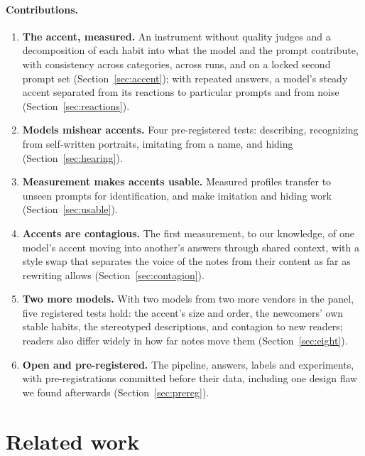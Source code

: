\documentclass[11pt]{article}
\begin{document}
\paragraph{Contributions.}
\begin{enumerate}
\item \textbf{The accent, measured.} An instrument without quality judges and a decomposition of each habit into what the model and the prompt contribute, with consistency across categories, across runs, and on a locked second prompt set (Section~\ref{sec:accent}); with repeated answers, a model's steady accent separated from its reactions to particular prompts and from noise (Section~\ref{sec:reactions}).
\item \textbf{Models mishear accents.} Four pre-registered tests: describing, recognizing from self-written portraits, imitating from a name, and hiding (Section~\ref{sec:hearing}).
\item \textbf{Measurement makes accents usable.} Measured profiles transfer to unseen prompts for identification, and make imitation and hiding work (Section~\ref{sec:usable}).
\item \textbf{Accents are contagious.} The first measurement, to our knowledge, of one model's accent moving into another's answers through shared context, with a style swap that separates the voice of the notes from their content as far as rewriting allows (Section~\ref{sec:contagion}).
\item \textbf{Two more models.} With two models from two more vendors in the panel, five registered tests hold: the accent's size and order, the newcomers' own stable habits, the stereotyped descriptions, and contagion to new readers; readers also differ widely in how far notes move them (Section~\ref{sec:eight}).
\item \textbf{Open and pre-registered.} The pipeline, answers, labels and experiments, with pre-registrations committed before their data, including one design flaw we found afterwards (Section~\ref{sec:prereg}).
\end{enumerate}

\section{Related work}
\end{document}
